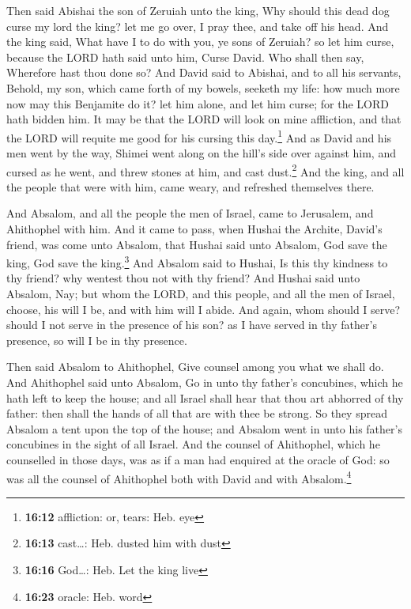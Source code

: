  Then said Abishai the son of Zeruiah unto the king, Why
should this dead dog curse my lord the king? let me go over, I pray
thee, and take off his head.  And the king said, What
have I to do with you, ye sons of Zeruiah? so let him curse, because the
LORD hath said unto him, Curse David. Who shall then say, Wherefore hast
thou done so?  And David said to Abishai, and to all his
servants, Behold, my son, which came forth of my bowels, seeketh my
life: how much more now may this Benjamite do it? let him alone, and let
him curse; for the LORD hath bidden him.  It may be that
the LORD will look on mine affliction, and that the LORD will requite me
good for his cursing this day.\footnote{\textbf{16:12} affliction: or,
  tears: Heb. eye}  And as David and his men went by the
way, Shimei went along on the hill's side over against him, and cursed
as he went, and threw stones at him, and cast dust.\footnote{\textbf{16:13}
  cast\ldots: Heb. dusted him with dust}  And the king,
and all the people that were with him, came weary, and refreshed
themselves there.

 And Absalom, and all the people the men of Israel, came
to Jerusalem, and Ahithophel with him.  And it came to
pass, when Hushai the Archite, David's friend, was come unto Absalom,
that Hushai said unto Absalom, God save the king, God save the
king.\footnote{\textbf{16:16} God\ldots: Heb. Let the king live}
 And Absalom said to Hushai, Is this thy kindness to thy
friend? why wentest thou not with thy friend?  And Hushai
said unto Absalom, Nay; but whom the LORD, and this people, and all the
men of Israel, choose, his will I be, and with him will I abide.
 And again, whom should I serve? should I not serve in
the presence of his son? as I have served in thy father's presence, so
will I be in thy presence.

 Then said Absalom to Ahithophel, Give counsel among you
what we shall do.  And Ahithophel said unto Absalom, Go
in unto thy father's concubines, which he hath left to keep the house;
and all Israel shall hear that thou art abhorred of thy father: then
shall the hands of all that are with thee be strong.  So
they spread Absalom a tent upon the top of the house; and Absalom went
in unto his father's concubines in the sight of all Israel.
 And the counsel of Ahithophel, which he counselled in
those days, was as if a man had enquired at the oracle of God: so was
all the counsel of Ahithophel both with David and with
Absalom.\footnote{\textbf{16:23} oracle: Heb. word}


